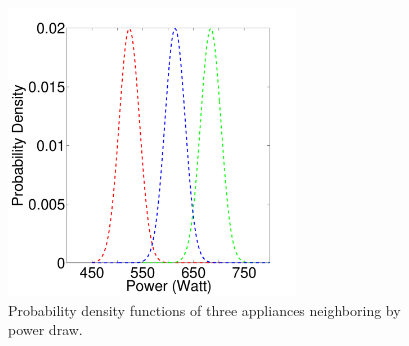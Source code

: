 \begin{figure}[h]
\centering
\includegraphics[width=3in]{figs/pdfRedd.pdf}
\caption{Probability density functions of three appliances neighboring by power draw.}
\label{fig_realPowerPDF}
\end{figure}

